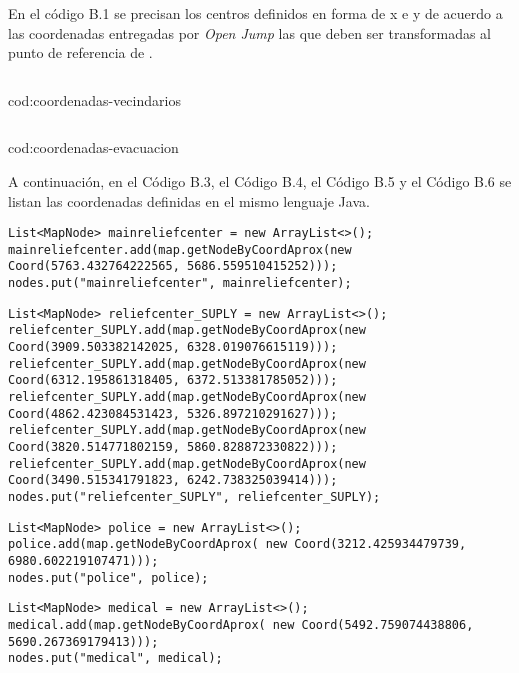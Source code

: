 En el código B.1 se precisan los centros definidos en forma de x e y de acuerdo
a las coordenadas entregadas por \textit{Open Jump} las que deben ser
transformadas al punto de referencia de \theone.



{\inputminted[linenos,frame=lines]{text}{the-one/src/neighborhoods.txt}}{cod:coordenadas-vecindarios}

{\inputminted[linenos,frame=lines]{text}{the-one/src/evacuation_centers.txt}}{cod:coordenadas-evacuacion}



A continuación, en el Código B.3, el Código B.4, el Código B.5 y el Código B.6
se listan las coordenadas definidas en el mismo lenguaje Java.



\begin{verbatim}
List<MapNode> mainreliefcenter = new ArrayList<>();
mainreliefcenter.add(map.getNodeByCoordAprox(new Coord(5763.432764222565, 5686.559510415252)));
nodes.put("mainreliefcenter", mainreliefcenter);
\end{verbatim}


\begin{verbatim}
List<MapNode> reliefcenter_SUPLY = new ArrayList<>();
reliefcenter_SUPLY.add(map.getNodeByCoordAprox(new Coord(3909.503382142025, 6328.019076615119)));
reliefcenter_SUPLY.add(map.getNodeByCoordAprox(new Coord(6312.195861318405, 6372.513381785052)));
reliefcenter_SUPLY.add(map.getNodeByCoordAprox(new Coord(4862.423084531423, 5326.897210291627)));
reliefcenter_SUPLY.add(map.getNodeByCoordAprox(new Coord(3820.514771802159, 5860.828872330822)));
reliefcenter_SUPLY.add(map.getNodeByCoordAprox(new Coord(3490.515341791823, 6242.738325039414)));
nodes.put("reliefcenter_SUPLY", reliefcenter_SUPLY);
\end{verbatim}


\begin{verbatim}
List<MapNode> police = new ArrayList<>();
police.add(map.getNodeByCoordAprox( new Coord(3212.425934479739, 6980.602219107471)));
nodes.put("police", police);
\end{verbatim}


\begin{verbatim}
List<MapNode> medical = new ArrayList<>();
medical.add(map.getNodeByCoordAprox( new Coord(5492.759074438806, 5690.267369179413)));
nodes.put("medical", medical);
\end{verbatim}
